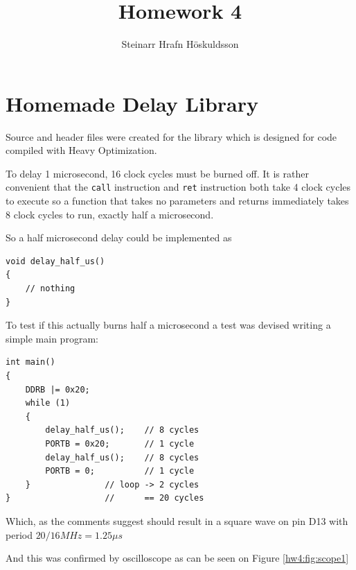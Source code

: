 \documentclass{article}
\title{Homework 4}
\author{Steinarr Hrafn Höskuldsson}
\newcommand{\mycomment}[1]{}
\begin{document}
\mycomment{

\begin{figure}[h]
    \centering
    \texttt{[image: LAB3/Basic1.png]}
    \caption{"Switch test" Breadboard set up}
    \label{fig:Switch_test}
\end{figure}



} %

\pagestyle{firststyle}
{\let\newpage\relax\maketitle}

\section{Homemade Delay Library}
Source and header files were created for the library which is designed for code compiled with Heavy Optimization. 

To delay 1 microsecond, 16 clock cycles must be burned off. It is rather convenient that the \verb"call" instruction and \verb"ret" instruction both take 4 clock cycles to execute so a function that takes no parameters and returns immediately takes 8 clock cycles to run, exactly half a microsecond.

So a half microsecond delay could be implemented as
\begin{lstlisting}
void delay_half_us()
{
	// nothing
}   
\end{lstlisting}
To test if this actually burns half a microsecond a test was devised writing a simple main program:

\begin{lstlisting}
int main()
{
	DDRB |= 0x20;
	while (1)
	{
		delay_half_us(); 	// 8 cycles
		PORTB = 0x20;		// 1 cycle
		delay_half_us();	// 8 cycles
		PORTB = 0;			// 1 cycle
	}				// loop -> 2 cycles
}					// 		== 20 cycles
\end{lstlisting}

Which, as the comments suggest should result in a square wave on pin D13 with period $20/16MHz = 1.25 \mu s$

And this was confirmed by oscilloscope as can be seen on Figure \ref{hw4:fig:scope1}
\end{document}
